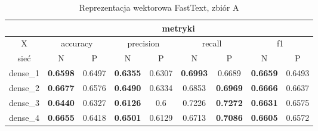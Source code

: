 \begin{table}[p] \centering
    \caption{Reprezentacja wektorowa FastText, zbiór A}
    \label{tab:wyniki_fasttext_A}
    \begin{tabular}{|c|c|c|c|c|c|c|c|c|}    \hline

                 & \multicolumn{8}{c|}{metryki}                                                                                                                                                                                                                                                                                  \\ \hline
        X        & \multicolumn{2}{c|}{accuracy}       & \multicolumn{2}{c|}{precision}      & \multicolumn{2}{c|}{recall}         & \multicolumn{2}{c|}{f1}                                                                                                                                                                     \\ \hline
        sieć     & N                                   & P                                   & N                                   & P                                   & N                                   & P                                   & N                                   & P                                   \\ \hline
        dense\_1 & \textbf{0.6598}                     & 0.6497                              & \textbf{0.6355}                     & 0.6307                              & \textbf{0.6993}                     & 0.6689                              & \textbf{0.6659}                     & 0.6493                              \\ \hline
        dense\_2 & \textbf{0.6677}                     & 0.6576                              & \textbf{0.6490}                     & 0.6334                              & 0.6853                              & \textbf{0.6969}                     & \textbf{0.6666}                     & 0.6637                              \\ \hline
        dense\_3 & \textbf{0.6440}                     & 0.6327                              & \textbf{0.6126}                     & 0.6                                 & 0.7226                              & \textbf{0.7272}                     & \textbf{0.6631}                     & 0.6575                              \\ \hline
        dense\_4 & \textbf{0.6655}                     & 0.6418                              & \textbf{0.6501}                     & 0.6129                              & 0.6713                              & \textbf{0.7086}                     & \textbf{0.6605}                     & 0.6572                              \\ \hline

\end{tabular}
\end{table}
